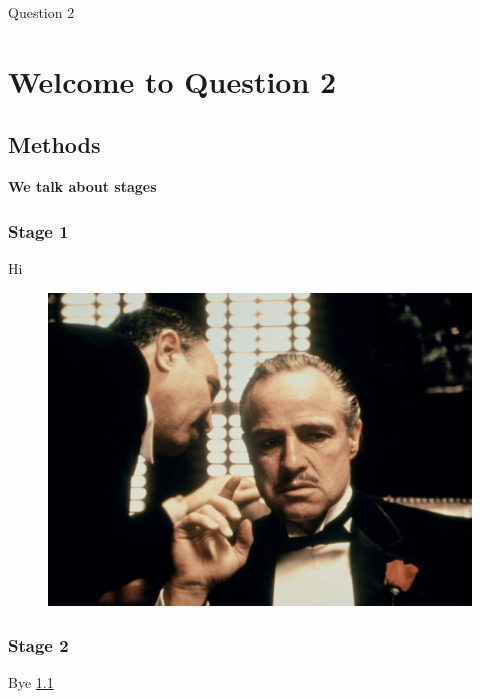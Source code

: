 \documentclass[a4paper,12pt]{report}
\begin{document}
	\begin{titlepage}
		\begin{center}
			\LARGE Question 2
		\end{center}
	\end{titlepage}
	\tableofcontents
	\pagebreak
	\chapter{Welcome to Question 2}
	\section{Methods}
	\LARGE{\textbf{We talk about stages}}
	\subsection{Stage 1}
		Hi
		\begin{figure}
			\includegraphics[scale=0.1]{q2.png}
			\label{god}
		\end{figure}
	\subsection{Stage 2}
		Bye \ref{god}
	\pagebreak
\end{document}
